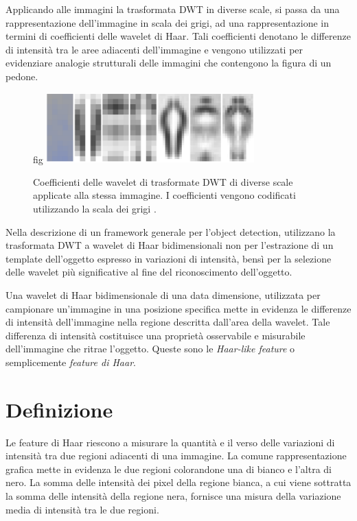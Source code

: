         Applicando alle immagini la trasformata DWT in diverse scale, si passa da una rappresentazione dell'immagine in scala dei grigi, ad una rappresentazione in termini di coefficienti delle wavelet di Haar.
        Tali coefficienti denotano le differenze di intensità tra le aree adiacenti dell'immagine e vengono utilizzati per evidenziare analogie strutturali delle immagini che contengono la figura di un pedone.

        \begin{figure}fig      \centering
            \includegraphics[width=8cm]{img/pedestrian_dwt.png}
            \caption{Coefficienti delle wavelet di trasformate DWT di diverse scale applicate alla stessa immagine. I coefficienti vengono codificati utilizzando la scala dei grigi \cite[Figura 3]{Oren97}.}
            \label{fig:non_standard_dwt}
        \end{figure}

        Nella descrizione di un framework generale per l'object detection, \citet{Papageorgiou98} utilizzano la trasformata DWT a wavelet di Haar bidimensionali non per l'estrazione di un template dell'oggetto espresso in variazioni di intensità, bensì per la selezione delle wavelet più significative al fine del riconoscimento dell'oggetto.

        Una wavelet di Haar bidimensionale di una data dimensione, utilizzata per campionare un'immagine in una posizione specifica mette in evidenza le differenze di intensità dell'immagine nella regione descritta dall'area della wavelet. Tale differenza di intensità costituisce una proprietà osservabile e misurabile dell'immagine che ritrae l'oggetto. Queste sono le \emph{Haar-like feature} o semplicemente \emph{feature di Haar}.

    \section{Definizione} %
    \label{sec:definizione}
        Le feature di Haar riescono a misurare la quantità e il verso delle variazioni di intensità tra due regioni adiacenti di una immagine.
        La comune rappresentazione grafica mette in evidenza le due regioni colorandone una di bianco e l'altra di nero.
        La somma delle intensità dei pixel della regione bianca, a cui viene sottratta la somma delle intensità della regione nera, fornisce una misura della variazione media di intensità tra le due regioni.

